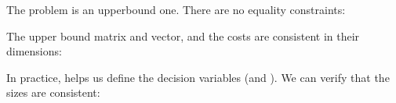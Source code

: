 \documentclass[letterpaper,10pt,english]{sphinxmanual}
\begin{document}
\begin{fulllineitems}
\begin{sphinxVerbatim}[commandchars=\\\{\}]
    
\end{sphinxVerbatim}

The problem is an upper\sphinxhyphen{}bound one. There are no equality constraints:

\begin{sphinxVerbatim}[commandchars=\\\{\}]
   
   
\end{sphinxVerbatim}

The upper bound matrix and vector, and the costs are consistent in their
dimensions:

\begin{sphinxVerbatim}[commandchars=\\\{\}]
   
   
   
   \PYG{p}{[}\PYG{p}{]}
   \PYG{p}{[}\PYG{p}{]}
   
\end{sphinxVerbatim}

In practice,  helps us define the decision
variables (and ). We can verify that the sizes are consistent:


\end{fulllineitems}
\end{document}
